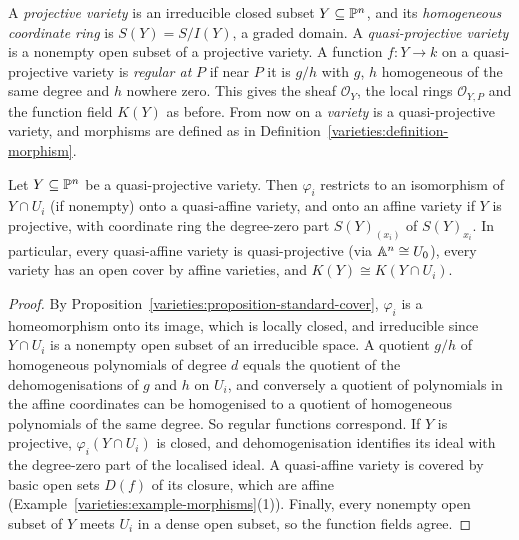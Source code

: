 \begin{definition}\label{varieties:definition-quasi-projective}
A \emph{projective variety} is an irreducible closed subset $Y \subseteq \mathbb{P}^n$, and its \emph{homogeneous coordinate ring} is
$S(Y) = S/I(Y)$, a graded domain. A \emph{quasi-projective variety} is a nonempty open subset of a projective variety. A function
$f \colon Y \to k$ on a quasi-projective variety is \emph{regular at} $P$ if near $P$ it is $g/h$ with $g$, $h$ homogeneous of the same degree and $h$
nowhere zero. This gives the sheaf $\mathcal{O}_Y$, the local rings $\mathcal{O}_{Y,P}$ and the function field $K(Y)$ as before. From now on a
\emph{variety} is a quasi-projective variety, and morphisms are defined as in Definition~\ref{varieties:definition-morphism}.
\end{definition}

\begin{proposition}\label{varieties:proposition-affine-cover}
Let $Y \subseteq \mathbb{P}^n$ be a quasi-projective variety. Then $\varphi_i$ restricts to an isomorphism of $Y \cap U_i$ (if nonempty) onto a
quasi-affine variety, and onto an affine variety if $Y$ is projective, with coordinate ring the degree-zero part $S(Y)_{(x_i)}$ of $S(Y)_{x_i}$.
In particular, every quasi-affine variety is quasi-projective (via $\mathbb{A}^n \cong U_0$), every variety has an open cover by affine varieties, and
$K(Y) \cong K(Y \cap U_i)$.
\end{proposition}

\begin{proof}
By Proposition~\ref{varieties:proposition-standard-cover}, $\varphi_i$ is a homeomorphism onto its image, which is locally closed, and irreducible
since $Y \cap U_i$ is a nonempty open subset of an irreducible space. A quotient $g/h$ of homogeneous polynomials of degree $d$ equals the
quotient of the dehomogenisations of $g$ and $h$ on $U_i$, and conversely a quotient of polynomials in the affine coordinates can be homogenised
to a quotient of homogeneous polynomials of the same degree. So regular functions correspond. If $Y$ is projective, $\varphi_i(Y \cap U_i)$ is
closed, and dehomogenisation identifies its ideal with the degree-zero part of the localised ideal. A quasi-affine variety is covered by basic
open sets $D(f)$ of its closure, which are affine (Example~\ref{varieties:example-morphisms}(1)). Finally, every nonempty open subset of $Y$ meets
$U_i$ in a dense open subset, so the function fields agree.
\end{proof}

